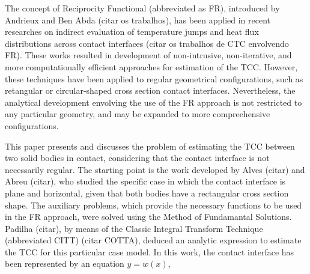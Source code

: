 \documentclass[conference,compsoc]{IEEEtran}
\begin{document}
The concept of Reciprocity Functional (abbreviated as FR), introduced by Andrieux and Ben Abda (citar os trabalhos), has been applied in recent researches on indirect evaluation of temperature jumps and heat flux distributions across contact interfaces (citar os trabalhos de CTC envolvendo FR). These works resulted in development of non-intrusive, non-iterative, and more computationally efficient approaches for estimation of the TCC. However, these techniques have been applied to regular geometrical configurations, such as retangular or circular-shaped cross section contact interfaces. Nevertheless, the analytical development envolving the use of the FR approach is not restricted to any particular geometry, and may be expanded to more compreehensive configurations.

This paper presents and discusses the problem of estimating the TCC between two solid bodies in contact, considering that the contact interface is not necessarily regular. The starting point is the work developed by Alves (citar) and Abreu (citar), who studied the specific case in which the contact interface is plane and horizontal, given that both bodies have a rectangular cross section shape. The auxiliary problems, which provide the necessary functions to be used in the FR approach, were solved using the Method of Fundamantal Solutions. Padilha (citar), by means of the Classic Integral Transform Technique (abbreviated CITT) (citar COTTA), deduced an analytic expression to estimate the TCC for this particular case model. In this work, the contact interface has been represented by an equation $ y = w(x)$, 
\end{document}
